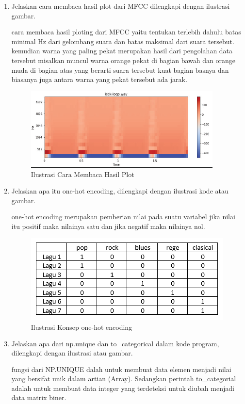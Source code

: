 \begin{enumerate}
\item Jelaskan cara membaca hasil plot dari MFCC dilengkapi dengan ilustrasi gambar. \par
cara membaca hasil ploting dari MFCC yaitu tentukan terlebih dahulu batas minimal Hz dari 
gelombang suara dan batas maksimal dari suara tersebut. kemudian warna yang paling pekat merupakan hasil 
dari pengolahan data tersebut misalkan muncul warna orange pekat di bagian bawah dan orange muda di bagian atas
yang berarti suara tersebut kuat bagian basnya dan biasanya juga antara warna yang pekat tersebut ada jarak.

\begin{figure}[ht]
\centering
\includegraphics[scale=0.5]{figures/1174012/chapter6/1,5.PNG}
\caption{Ilustrasi Cara Membaca Hasil Plot}
\label{contoh}
\end{figure}

\item Jelaskan apa itu one-hot encoding, dilengkapi dengan ilustrasi kode atau gambar.\par
one-hot encoding merupakan pemberian nilai pada suatu variabel jika nilai itu positif 
maka nilainya satu dan jika negatif maka nilainya nol.

\begin{figure}[ht]
\centering
\includegraphics[scale=0.5]{figures/1174012/chapter6/1,6.PNG}
\caption{Ilustrasi Konsep one-hot encoding}
\label{contoh}
\end{figure}

\item Jelaskan apa dari np.unique dan to\_categorical dalam kode program, dilengkapi dengan ilustrasi atau gambar.\par
fungsi dari NP.UNIQUE dalah untuk membuat data elemen menjadi nilai yang bersifat unik dalam artian (Array). 
Sedangkan perintah to\_categorial adalah untuk membuat data integer yang terdeteksi untuk diubah menjadi data matrix biner. 
    

\end{enumerate}
